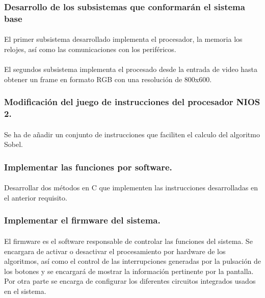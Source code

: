 \documentclass[a4paper,12pt,titlepage,final]{book}
\begin{document}
\subsubsection{Desarrollo de los subsistemas que conformarán el sistema base}

\paragraph{}
El primer subsistema desarrollado implementa el procesador, la memoria los relojes, así como las comunicaciones con los periféricos.

\paragraph{}
El segundos subsistema implementa el procesado desde la entrada de video hasta obtener un frame en formato RGB con una resolución de 800x600.

\subsubsection{Modificación del juego de instrucciones del procesador NIOS 2.}
\paragraph{}
Se ha de añadir un conjunto de instrucciones que faciliten el calculo del algoritmo Sobel.

\subsubsection{Implementar las funciones por software.}
\paragraph{}
Desarrollar dos métodos en C que implementen las instrucciones desarrolladas en el anterior requisito.

\subsubsection{Implementar el firmware del sistema.}
\paragraph{}
El firmware es el software responsable de controlar las funciones del sistema. Se encargara de activar o desactivar el procesamiento por hardware de los algoritmos, así como el control de las interrupciones generadas por la pulsación de los botones y se encargará de mostrar la información pertinente por la pantalla. Por otra parte se encarga de configurar los diferentes circuitos integrados usados en el sistema.
\end{document}
